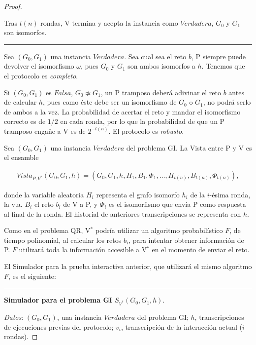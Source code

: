 \begin{proof}
\begin{algorithm}
		Tras $t(n)$ rondas, V termina y acepta la instancia como $Verdadera$, $G_0$ y $G_1$ son isomorfos.
		
		\label{GIinteractive:alg}
	\end{algorithm}
	\rule{\textwidth}{1pt}
	
	\hfil

	Sea $(G_0,G_1)$ una instancia $Verdadera$. Sea cual sea el reto $b$, P siempre puede devolver el isomorfismo $\omega$, pues $G_0$ y $G_1$ son ambos isomorfos a $h$. Tenemos que el protocolo es \textit{completo}.
	
	Si $(G_0,G_1)$ es $Falsa$, $G_0 \not\simeq G_1$, un P tramposo deberá adivinar el reto $b$ antes de calcular $h$, pues como éste debe ser un isomorfismo de $G_0$ o $G_1$, no podrá serlo de ambos a la vez. La probabilidad de acertar el reto y mandar el isomorfismo correcto es de $1/2$ en cada ronda, por lo que la probabilidad de que un P tramposo engañe a V es de $2^{-t(n)}$. El protocolo es \textit{robusto}.
	
	\hfil
	
	Sea $(G_0, G_1)$ una instancia $Verdadera$ del problema GI. La Vista entre P y V es el ensamble
	
	\begin{align*}
		Vista_{P,V^*}(G_0, G_1, h) = (G_0, G_1, h,H_1,B_1,\Phi_1,\dots , H_{t(n)}, B_{t(n)}, \Phi_{t(n)}),
	\end{align*}

	donde la variable aleatoria $H_i$ representa el grafo isomorfo $h_i$ de la $i$-ésima ronda, la v.a. $B_i$ el reto $b_i$ de V a P, y $\Phi_i$ es el isomorfismo que envía P como respuesta al final de la ronda. El historial de anteriores transcripciones se representa con $h$.
	
	Como en el problema QR, V$^*$ podría utilizar un algoritmo probabilístico $F$, de tiempo polinomial, al calcular los retos $b_i$, para intentar obtener información de P. $F$ utilizará toda la información accesible a V$^*$ en el momento de enviar el reto.
	
	El Simulador para la prueba interactiva anterior, que utilizará el mismo algoritmo $F$, es el siguiente:
	
	
	\hfil 
	
	\rule{\textwidth}{1pt}
	
	\textbf{Simulador para el problema GI} $S_{V^*}(G_0, G_1 ,h)$.
	
	\hfil
	
	\textit{Datos}: \quad $(G_0, G_1)$, una instancia $Verdadera$ del problema GI; \quad $h$, transcripciones de ejecuciones previas del protocolo; \quad $v_i$, transcripción de la interacción actual ($i$ rondas).
	

\end{proof}

